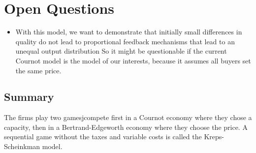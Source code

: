 \documentclass[11pt]{article}
\begin{document}
\section{Open Questions}

\begin{itemize}

    \item With this model, we want to demonstrate that initially small
        differences in quality do not lead to proportional feedback mechanisms
        that lead to an unequal output distribution So it might be questionable
        if the current Cournot model is the model of our interests, because it
        assumes all buyers set the same price. 

\end{itemize}

\subsection{Summary}
The firms play two gamesjcompete first in a Cournot economy where they chose a
capacity, then in a Bertrand-Edgeworth economy where they choose the price.  A
sequential game without the taxes and variable costs is called the
Kreps-Scheinkman model.
\end{document}

